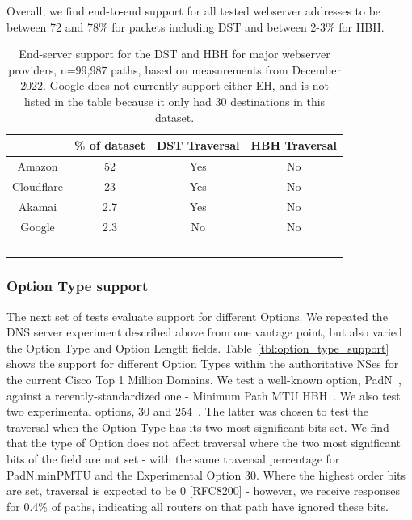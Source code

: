\documentclass[conference]{IEEEtran}
\begin{document}
Overall, we find end-to-end support for all tested webserver addresses to be between 72 and 78\% for  packets including DST and between 2-3\% for HBH.


\begin{table} 
\begin{tabular}{c|c|c|c}
           & \% of dataset & DST Traversal & HBH Traversal\\
\hline
Amazon & 52                      & Yes                & No                 \\
\hline
Cloudflare     & 23                     & Yes                 & No                 \\
\hline
Akamai    & 2.7                     & Yes                & No                 \\
\hline
Google      & 2.3                     & No                 & No                 \\
\
\end{tabular}
\label{tbl:web_provider_support}
\caption{End-server support for the DST and HBH for major webserver providers, n=99,987 paths, based on measurements from December 2022. Google does not currently support either EH, and is not listed in the table because it only had 30 destinations in this dataset.
}
\end{table}


\subsubsection{Option Type support}

The next set of tests evaluate support for different Options. We repeated the DNS server experiment described above from one vantage point, but also varied the Option Type and Option Length fields. 
Table~\ref{tbl:option_type_support} shows the support for different Option Types within the authoritative NSes for the current Cisco Top 1 Million Domains. We test a well-known option, PadN~\cite{rfc2460}, against a recently-standardized one - Minimum Path MTU HBH~\cite{rfc9268}. We also test two experimental options, 30 and 254~\cite{RFC4727}. The latter was chosen to test the traversal when the Option Type has its two most significant bits set.
We find that the type of Option  does not affect traversal where the two most significant bits of the field are not set - with the same traversal percentage for PadN,minPMTU and the Experimental Option 30. Where the highest order bits are set, traversal is expected to be 0 [RFC8200] - however, we  receive responses for 0.4\% of paths, indicating all routers on that path have ignored these bits.
\end{document}
